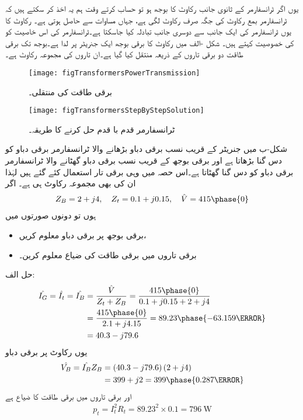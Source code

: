 	یوں اگر ٹرانسفارمر کے ثانوی جانب  رکاوٹ  کا بوجھ ہو تو حساب کرتے وقت ہم یہ اخذ کر سکتے ہیں کہ  ٹرانسفارمر بمع رکاوٹ  کی  جگہ  صرف   رکاوٹ لگی ہے، جہاں  مساوات   سے حاصل ہوتی ہے۔ رکاوٹ کا یوں ٹرانسفارمر کی ایک جانب سے دوسری جانب تبادلہ کیا جاسکتا ہے۔ٹرانسفارمر کی اس خاصیت کو   کی خصوصیت  کہتے ہیں۔
%
شکل -الف میں رکاوٹ  کا برقی بوجھ ایک جنریٹر پر لدا ہے۔بوجھ تک برقی طاقت دو برقی تاروں کے ذریعہ منتقل کیا گیا ہے۔ان تاروں کی مجموعہ رکاوٹ  ہے۔
\begin{figure}
\centering
\texttt{[image: figTransformersPowerTransmission]}
\caption{برقی طاقت کی منتقلی۔}
\label{شکل_ٹرانسفارمر_برقی_طاقت_کی_منتقلی}
\end{figure}
%
\begin{figure}
\centering
\texttt{[image: figTransformersStepByStepSolution]}
\caption{ٹرانسفارمر قدم با قدم حل کرنے کا طریقہ۔}
\label{شکل_ٹرانسفارمر_قدم_با_قدم_حل}
\end{figure}

شکل-ب میں جنریٹر کے قریب نسب برقی دباو بڑھانے والا ٹرانسفارمر برقی دباو کو دس گنا بڑھاتا ہے اور برقی بوجھ کے قریب نسب برقی دباو گھٹانے والا ٹرانسفارمر برقی دباو کو دس گنا گھٹاتا ہے۔اس حصہ میں وہی برقی تار استعمال کئے گئے ہیں لہٰذا ان کی بھی مجموعہ رکاوٹ  ہی ہے۔
اگر 
\begin{align*}
Z_B=2+j 4, \quad Z_t=0.1 +j 0.15, \quad \hat{V}=415\phase{0}
\end{align*}
ہوں تو دونوں صورتوں میں
\begin{itemize}
\item
برقی بوجھ پر برقی دباو معلوم کریں،
\item
برقی تاروں میں برقی طاقت کی ضیاع معلوم کرین۔
\end{itemize}

حل الف:
\begin{align*}
\hat{I_G}=\hat{I_t}=\hat{I_B}&=\frac{\hat{V}}{Z_t+Z_B}=\frac{415\phase{0}}{0.1+j 0.15+2+j 4}\\
&=\frac{415\phase{0}}{2.1+j 4.15}=89.23\phase{-63.159\degree}\\
&=40.3-j79.6
\end{align*}
یوں رکاوٹ پر برقی دباو
\begin{align*}
\hat{V_B}=\hat{I_B} Z_B&=\left(40.3-j79.6 \right) \left( 2+j 4\right)\\
&=399+j2=399\phase{0.287\degree}
\end{align*}
اور برقی تاروں میں برقی طاقت کا ضیاع ہے
\begin{align*}
p_t=I_t^2 R_t=89.23^2 \times 0.1=\SI{796}{\watt}
\end{align*}

